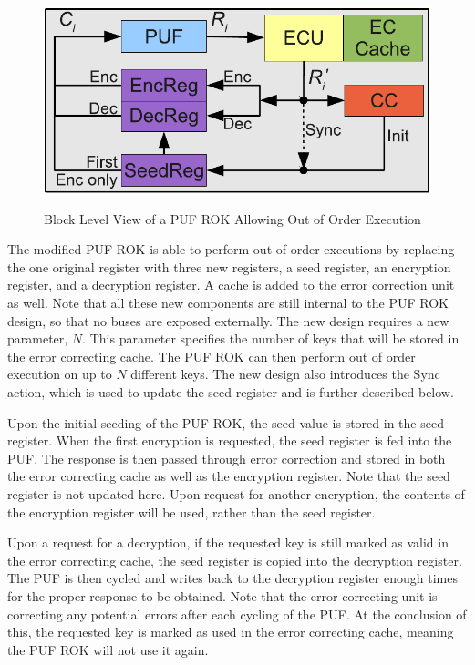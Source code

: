 \begin{figure}[!ht]
\includegraphics[width=500px]{images/rok_socreg.pdf}
\label{fig:rok}
\caption{Block Level View of a PUF ROK Allowing Out of Order Execution}
\end{figure}
\FloatBarrier

The modified PUF ROK is able to perform out of order executions by replacing the one original register with three
new registers, a seed register, an encryption register, and a decryption register. A cache is added to the error
correction unit as well. Note that all these new components are still internal to the PUF ROK design, so that no
buses are exposed externally.
The new design requires a new parameter, $N$. This parameter specifies the number of keys that will be stored in
the error correcting cache. The PUF ROK can then perform out of order execution on up to $N$ different keys.
The new design also introduces the Sync action, which is used to update the seed register and is further described
below.

Upon the initial seeding of the PUF ROK, the seed value is stored in the seed register. When the first encryption
is requested, the seed register is fed into the PUF. The response is then passed through error correction and stored
in both the error correcting cache as well as the encryption register. Note that the seed register is not updated here.
Upon request for another encryption, the contents of the encryption register will be used, rather than the seed register.

Upon a request for a decryption, if the requested key is still marked as valid in the error correcting cache,
the seed register is copied into the decryption register. The PUF is then cycled
and writes back to the decryption register enough times for the proper response to be obtained. Note that the
error correcting unit is correcting any potential errors after each cycling of the PUF. At the conclusion of this, the
requested key is marked as used in the error correcting cache, meaning the PUF ROK will not use it again.

